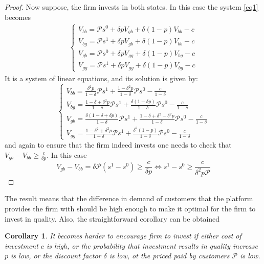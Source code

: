 \documentclass[a4paper]{article}
\newtheorem{corollary}{Corollary}[theorem]
\begin{document}
\begin{proof}
	Now suppose, the firm invests in both states. In this case the system \eqref{eq1} becomes
	\begin{align*}
	\begin{cases}
	V_{bb} = \mathcal{P}s^0 + \delta p V_{gb} + \delta(1-p)V_{bb} - c\\
	V_{bg} = \mathcal{P}s^1 + \delta p V_{gb} + \delta(1-p)V_{bb} - c\\
	V_{gb} = \mathcal{P}s^0 + \delta pV_{gg} + \delta(1-p)V_{bg} - c\\
	V_{gg} = \mathcal{P}s^1 + \delta p V_{gg} + \delta (1 - p)V_{bg} - c
	\end{cases}
	\end{align*}
	It is a system of linear equations, and its solution is given by:
	$$\begin{cases}
	V_{bb} = \frac{\delta^2p}{1-\delta}\mathcal{P}s^1 + \frac{1-\delta^2p}{1-\delta}\mathcal{P}s^0 - \frac{c}{1-\delta}\\
	V_{bg} = \frac{1-\delta + \delta^2p}{1-\delta}\mathcal{P}s^1 + \frac{\delta(1-\delta p)}{1-\delta}\mathcal{P}s^0 - \frac{c}{1-\delta}\\
	V_{gb} = \frac{\delta(1-\delta+\delta p)}{1-\delta}\mathcal{P}s^1 + \frac{1-\delta + \delta^2 - \delta^2 p}{1- \delta}\mathcal{P}s^0 - \frac{c}{1-\delta}\\
	V_{gg} = \frac{1 - \delta^2 + \delta^2 p}{1 - \delta}\mathcal{P}s^1 + \frac{\delta^2(1-p)}{1- \delta}\mathcal{P}s^0 - \frac{c}{1 - \delta}
	\end{cases}$$
	and again to ensure that the firm indeed invests one needs to check that $V_{gb} - V_{bb} \ge \frac{c}{\delta p}$. In this case $$V_{gb} - V_{bb} = \delta\mathcal{P}(s^1 - s^0) \ge \frac{c}{\delta p} \iff s^1 - s^0 \ge \frac{c}{\delta^2 p \mathcal{P}}$$
\end{proof}
The result means that the difference in demand of customers that the platform provides the firm with should be high enough to make it optimal for the firm to invest in quality. Also, the straightforward corollary can be obtained
\begin{corollary}
	It becomes harder to encourage firm to invest if either cost of investment $c$ is high, or the probability that investment results in quality increase $p$ is low, or the discount factor $\delta$ is low, ot the priced paid by customers $\mathcal{P}$ is low.
\end{corollary}
\end{document}
